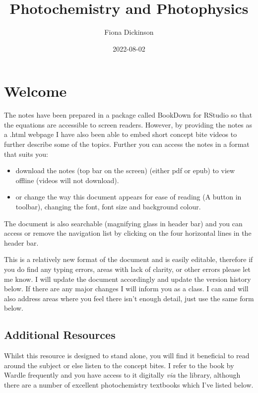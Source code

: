 \documentclass[
]{book}
\title{Photochemistry and Photophysics}
\author{Fiona Dickinson}
\date{2022-08-02}
\providecommand{\tightlist}{%
  \setlength{\itemsep}{0pt}\setlength{\parskip}{0pt}}
\begin{document}
\maketitle

{
\setcounter{tocdepth}{1}
\tableofcontents
}
\hypertarget{welcome}{%
\chapter*{Welcome}\label{welcome}}

The notes have been prepared in a package called BookDown for RStudio so that the equations are accessible to screen readers. However, by providing the notes as a .html webpage I have also been able to embed short concept bite videos to further describe some of the topics. Further you can access the notes in a format that suits you:

\begin{itemize}
\tightlist
\item
  download the notes (top bar on the screen) (either pdf or epub) to view offline (videos will not download).
\item
  or change the way this document appears for ease of reading (A button in toolbar), changing the font, font size and background colour.
\end{itemize}

The document is also searchable (magnifying glass in header bar) and you can access or remove the navigation list by clicking on the four horizontal lines in the header bar.

This is a relatively new format of the document and is easily editable, therefore if you do find any typing errors, areas with lack of clarity, or other errors please let me know. I will update the document accordingly and update the version history below. If there are any major changes I will inform you as a class. I can and will also address areas where you feel there isn't enough detail, just use the same form below.

\hypertarget{sec:AddnRes}{%
\section{Additional Resources}\label{sec:AddnRes}}

Whilst this resource is designed to stand alone, you will find it beneficial to read around the subject or else listen to the concept bites. I refer to the book by Wardle frequently and you have access to it digitally \emph{via} the library, although there are a number of excellent photochemistry textbooks which I've listed below.
\end{document}
